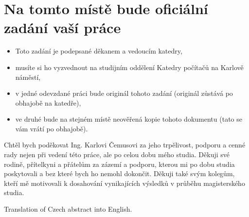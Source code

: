 \documentclass[11pt,twoside,a4paper]{book}
\theoremstyle{definition}
\begin{document}
\dptranslate                %

{
 \cleardoublepage \thispagestyle{empty}
\chapter*{Na tomto místě bude oficiální zadání vaší práce}
\begin{itemize}
\item Toto zadání je podepsané děkanem a vedoucím katedry,
\item musíte si ho vyzvednout na studijním oddělení Katedry počítačů na Karlově náměstí,
\item v jedné odevzdané práci bude originál tohoto zadání (originál zůstává po obhajobě na katedře),
\item ve druhé bude na stejném místě neověřená kopie tohoto dokumentu (tato se vám vrátí po obhajobě).
\end{itemize}
\newpage
}

\coverpagestarts


\acknowledgements
\noindent
Chtěl bych poděkovat Ing. Karlovi Čemusovi za jeho trpělivost, podporu a
cenné rady nejen při vedení této práce, ale po celou dobu mého studia.
Děkuji své rodině, přítelkyni a přátelům za zázemí a podporu, kterou
mi po dobu studia poskytovali a bez které bych ho nemohl dokončit.
Děkuji také svým kolegům, kteří mě motivovali k dosahování vynikajících
výsledků v průběhu magisterského studia.






\abstractpage

Translation of Czech abstract into English.
\end{document}
